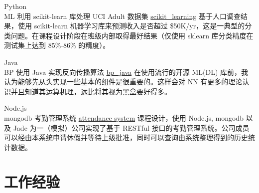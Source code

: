 \documentclass[utf8]{twentysecondcv} %
\begin{document}
\begin{twenty}

    \twentyitem
        {Python \\ ML}
        {利用 scikit-learn 库处理 UCI Adult 数据集}
        {\href{https://github.com/MiaoDX/scikit\_learning/}{scikit\_learning}}
        {}
		{基于人口调查结果，使用 scikit-learn 机器学习库来预测收入是否超过 \$50K/yr，这是一典型的分类问题。在课程设计阶段在班级内部取得最好结果（仅使用 sklearn 库分类精度在测试集上达到 85\%-86\% 的精度）。}        
     	
	

        
    \twentyitem
        {Java \\ BP}
        {使用 Java 实现反向传播算法}
        {\href{https://github.com/MiaoDX/bp_java}{bp\_java}}
        {}                
        {在使用流行的开源 ML(\/DL) 库前，我认为能够先从头实现一些基本的组件是很重要的。这样会对 NN 有更多的理论认识并且知道其运算机理，远比将其视为黑盒要好得多。}

    \twentyitem
        {Node.js \\ mongodb}
        {考勤管理系统}
        {\href{https://github.com/SEAPC2016/attendance}{attendance system}}
        {}
        {课程设计，使用 Node.js, mongodb 以及 Jade 为一（模拟）公司实现了基于 RESTful 接口的考勤管理系统。公司成员可以经由本系统申请休假并等待上级批准，同时可以查询由系统整理得到的历史统计数据。}

        


\end{twenty}


\section{工作经验}

%

%


%   
%

%
%
%   
%
%
%    
%    
\end{document}
